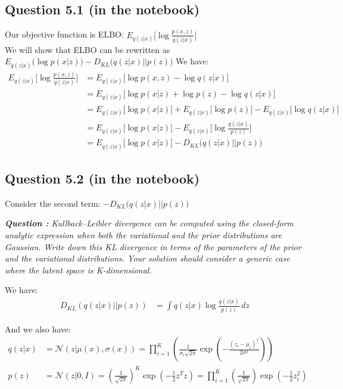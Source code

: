 \documentclass{article}
\begin{document}
\subsection*{Question 5.1 (in the notebook)}
Our objective function is ELBO: $E_{q(z|x)}\big[\log \frac{p(x,z)}{q(z|x)}\big]$ \\
We will show that ELBO can be rewritten as $E_{q(z|x)}\big(\log p(x|z)\big) - D_{KL} \big( q(z|x) \lvert \rvert  p(z)\big)$
We have:
\begin{align*}
  E_{q(z|x)}\big[\log \frac{p(x,z)}{q(z|x)}\big] & = E_{q(z|x)}\big[\log p(x,z) - \log q(z|x)\big]                                                     \\
                                                 & = E_{q(z|x)}\big[\log p(x|z) + \log p(z) - \log q(z|x)\big]                                         \\
                                                 & = E_{q(z|x)}\big[\log p(x|z)\big] + E_{q(z|x)}\big[\log p(z)\big] - E_{q(z|x)}\big[\log q(z|x)\big] \\
                                                 & = E_{q(z|x)}\big[\log p(x|z)\big] - E_{q(z|x)}\big[\log \frac{q(z|x)}{p(z)}\big]                    \\
                                                 & = E_{q(z|x)}\big[\log p(x|z)\big] - D_{KL} \big( q(z|x) \lvert \rvert  p(z)\big)
\end{align*}

\subsection*{Question 5.2 (in the notebook)}
Consider the second term: $- D_{KL} \big( q(z|x) \lvert \rvert  p(z)\big)$

\textit{\textbf{Question :} Kullback–Leibler divergence can be computed using the closed-form analytic expression when both the variational and the prior distributions are Gaussian. Write down this KL divergence in terms of the parameters of the prior and the variational distributions. Your solution should consider a generic case where the latent space is K-dimensional.}

We have:
\begin{align*}
  D_{KL} \left(q(z|x) \lvert\rvert p(z)\right) & = \int q(z|x) \log \frac{q(z|x)}{p(z)} \,dz
\end{align*}

And we also have:
\begin{equation}
  \begin{split}
    q(z|x) & = \mathcal{N}(z|\mu(x), \sigma(x)) = \prod_{i=1}^{K}\left(\frac{1}{\sigma_i\sqrt{2\pi}} \exp\left(-\frac{(z_i - \mu_i)^2}{2\sigma^2}\right)\right)                                    \\
    p(z)   & = \mathcal{N}(z|0, I) = \left(\frac{1}{\sqrt{2\pi}}\right)^K \exp\left(-\frac{1}{2}z^Tz\right) = \prod_{i=1}^{K}\left(\frac{1}{\sqrt{2\pi}}\right) \exp\left(-\frac{1}{2}z_i^2\right)
  \end{split}
\end{equation}
\end{document}

